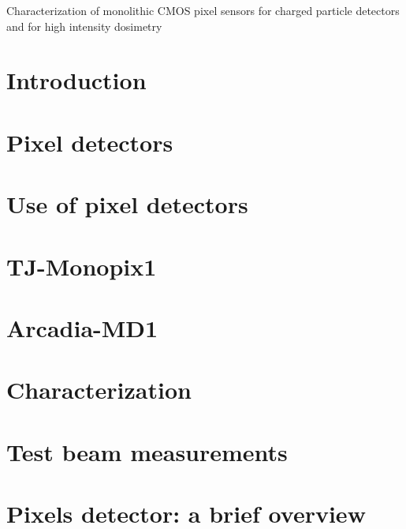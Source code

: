 \documentclass[a4paper,11pt]{report}
\begin{document}
\linenumbers

\tableofcontents

Characterization of monolithic CMOS pixel sensors for charged particle detectors and for high intensity dosimetry 

\chapter{Introduction}


\chapter{Pixel detectors}


\chapter{Use of pixel detectors}


\chapter{TJ-Monopix1}


\chapter{Arcadia-MD1}


\chapter{Characterization}


\chapter{Test beam measurements}



\appendix
\chapter{Pixels detector: a brief overview}




\printbibliography[heading=bibintoc, title={Bibliography}] 
\end{document}
